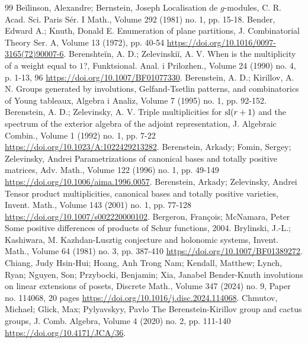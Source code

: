 \begin{thebibliography}{99}
 Beĭlinson, Alexandre; Bernstein, Joseph Localisation de $g$-modules, C. R. Acad. Sci. Paris Sér. I Math., Volume 292 (1981) no. 1, pp. 15-18.
 Bender, Edward A.; Knuth, Donald E. Enumeration of plane partitions, J. Combinatorial Theory Ser. A, Volume 13 (1972), pp. 40-54 \url{https://doi.org/10.1016/0097-3165(72)90007-6}.
 Berenshteĭn, A. D.; Zelevinskiĭ, A. V. When is the multiplicity of a weight equal to $1$?, Funktsional. Anal. i Prilozhen., Volume 24 (1990) no. 4, p. 1-13, 96 \url{https://doi.org/10.1007/BF01077330}.
 Berenstein, A. D.; Kirillov, A. N. Groups generated by involutions, Gelfand-Tsetlin patterns, and combinatorics of Young tableaux, Algebra i Analiz, Volume 7 (1995) no. 1, pp. 92-152.
 Berenstein, A. D.; Zelevinsky, A. V. Triple multiplicities for ${\rm sl}(r+1)$ and the spectrum of the exterior algebra of the adjoint representation, J. Algebraic Combin., Volume 1 (1992) no. 1, pp. 7-22 \url{https://doi.org/10.1023/A:1022429213282}.
 Berenstein, Arkady; Fomin, Sergey; Zelevinsky, Andrei Parametrizations of canonical bases and totally positive matrices, Adv. Math., Volume 122 (1996) no. 1, pp. 49-149 \url{https://doi.org/10.1006/aima.1996.0057}.
 Berenstein, Arkady; Zelevinsky, Andrei Tensor product multiplicities, canonical bases and totally positive varieties, Invent. Math., Volume 143 (2001) no. 1, pp. 77-128 \url{https://doi.org/10.1007/s002220000102}.
 Bergeron, François; McNamara, Peter Some positive differences of products of Schur functions, 2004.
 Brylinski, J.-L.; Kashiwara, M. Kazhdan-Lusztig conjecture and holonomic systems, Invent. Math., Volume 64 (1981) no. 3, pp. 387-410 \url{https://doi.org/10.1007/BF01389272}.
 Chiang, Judy Hsin-Hui; Hoang, Anh Trong Nam; Kendall, Matthew; Lynch, Ryan; Nguyen, Son; Przybocki, Benjamin; Xia, Janabel Bender-Knuth involutions on linear extensions of posets, Discrete Math., Volume 347 (2024) no. 9, Paper no. 114068, 20 pages \url{https://doi.org/10.1016/j.disc.2024.114068}.
 Chmutov, Michael; Glick, Max; Pylyavskyy, Pavlo The Berenstein-Kirillov group and cactus groups, J. Comb. Algebra, Volume 4 (2020) no. 2, pp. 111-140 \url{https://doi.org/10.4171/JCA/36}.

\end{thebibliography}
